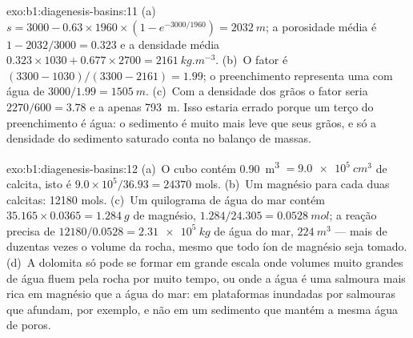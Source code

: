 \begin{solution}{exo:b1:diagenesis-basins:11}
(a)~$s = 3000 - 0.63\times1960\times(1 - e^{-3000/1960}) = \qty{2032}{m}$; a porosidade
média é $1 - 2032/3000 = \num{0.323}$ e a densidade média
$0.323\times1030 + 0.677\times2700 = \qty{2161}{kg.m^{-3}}$. (b)~O fator é
$(3300 - 1030)/(3300 - 2161) = \num{1.99}$; o preenchimento representa uma  com
água de $3000/1.99 = \qty{1505}{m}$. (c)~Com a densidade dos grãos o fator seria
$2270/600 = \num{3.78}$ e a  apenas \qty{793}{m}. Isso estaria errado porque um
terço do preenchimento é água: o sedimento é muito mais leve que seus grãos, e só a
densidade do sedimento saturado conta no balanço de massas.
\end{solution}

\begin{solution}{exo:b1:diagenesis-basins:12}
(a)~O cubo contém \qty{0.90}{m^3} $= \qty{9.0e5}{cm^3}$ de calcita, isto é
$9.0\times10^5/36.93 = \num{24370}$ mols. (b)~Um magnésio para cada duas calcitas:
\num{12180} mols. (c)~Um quilograma de água do mar contém $35.165\times0.0365 =
\qty{1.284}{g}$ de magnésio, $1.284/24.305 = \qty{0.0528}{mol}$; a reação precisa de
$12180/0.0528 = \qty{2.31e5}{kg}$ de água do mar, $\qty{224}{m^3}$ --- mais de duzentas
vezes o volume da rocha, mesmo que todo íon de magnésio seja tomado. (d)~A dolomita só pode
se formar em grande escala onde volumes muito grandes de água fluem pela rocha por muito
tempo, ou onde a água é uma salmoura mais rica em magnésio que a água do mar: em plataformas
inundadas por salmouras que afundam, por exemplo, e não em um sedimento que mantém a mesma
água de poros.
\end{solution}

